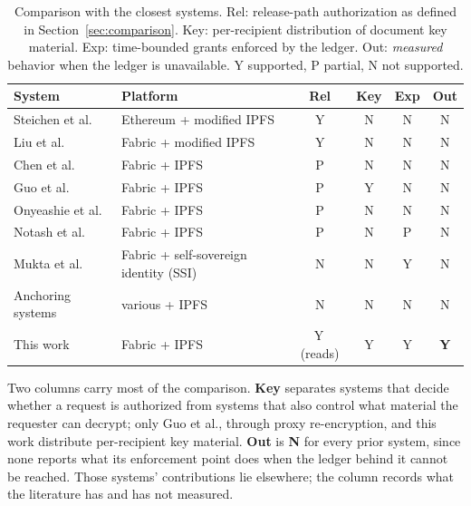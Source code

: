 \documentclass[preprint,12pt]{elsarticle}
\begin{document}
\begin{table}[!t]
\centering
\caption{Comparison with the closest systems. Rel: release-path authorization
as defined in Section~\ref{sec:comparison}. Key: per-recipient distribution of
document key material. Exp: time-bounded grants enforced by the ledger. Out:
\emph{measured} behavior when the ledger is unavailable. Y supported,
P partial, N not supported.}
\label{tab:related}
\footnotesize
\setlength{\tabcolsep}{4pt}
\begin{tabular}{@{}>{\raggedright\arraybackslash}p{}%
                 >{\raggedright\arraybackslash}p{}cccc@{}}
\toprule
System & Platform & Rel & Key & Exp & Out \\
\midrule
Steichen et al.~\cite{steichen2018blockchain} & Ethereum + modified IPFS
  & Y & N & N & N \\
Liu et al.~\cite{liu2026rbacipfs} & Fabric + modified IPFS
  & Y & N & N & N \\
Chen et al.~\cite{chen2022filewallet} & Fabric + IPFS & P & N & N & N \\
Guo et al.~\cite{guo2024efficient} & Fabric + IPFS & P & Y & N & N \\
Onyeashie et al.~\cite{onyeashie2025fabricEvidence} & Fabric + IPFS
  & P & N & N & N \\
Notash et al.~\cite{notash2026adaptive} & Fabric + IPFS & P & N & P & N \\
Mukta et al.~\cite{mukta2026zerotrust} & Fabric + self-sovereign identity (SSI) & N & N & Y & N \\
Anchoring systems~\cite{liu2024blockchain,twoLevelBlockchain,verma2021nyaya,hanafi2021ipfschain,peelam2026decentralized}
  & various + IPFS & N & N & N & N \\
\midrule
This work & Fabric + IPFS & Y\,(reads) & Y & Y & \textbf{Y} \\
\bottomrule
\end{tabular}
\end{table}

Two columns carry most of the comparison. \textbf{Key} separates systems
that decide whether a request is authorized from systems that also control what
material the requester can decrypt; only Guo et al., through proxy
re-encryption, and this work distribute per-recipient key material.
\textbf{Out} is \textbf{N} for every prior system, since none reports what its
enforcement point does when the ledger behind it cannot be reached. Those
systems' contributions lie elsewhere; the column records what the literature
has and has not measured.
\end{document}
